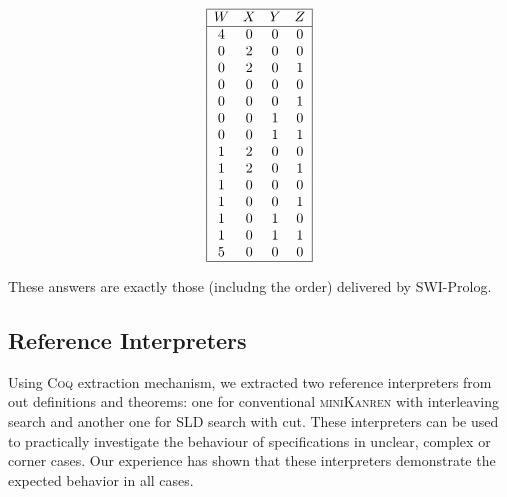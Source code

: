 \[
\begin{array}{|cccc|}
\hline
W & X & Y & Z \\
\hline
4 & 0 & 0 & 0 \\
0 & 2 & 0 & 0 \\
0 & 2 & 0 & 1 \\
0 & 0 & 0 & 0 \\
0 & 0 & 0 & 1 \\
0 & 0 & 1 & 0 \\
0 & 0 & 1 & 1 \\
1 & 2 & 0 & 0 \\
1 & 2 & 0 & 1 \\
1 & 0 & 0 & 0 \\
1 & 0 & 0 & 1 \\
1 & 0 & 1 & 0 \\
1 & 0 & 1 & 1 \\
5 & 0 & 0 & 0 \\
\hline
\end{array}
\]

These answers are exactly those (includng the order) delivered by SWI-Prolog. 

\subsection{Reference Interpreters}

Using \textsc{Coq} extraction mechanism, we extracted two reference interpreters from out definitions and theorems: one for conventional
\textsc{miniKanren} with interleaving search and another one for SLD search with cut. These interpreters can be used to practically investigate the behaviour
of specifications in unclear, complex or corner cases. Our experience has shown that these interpreters demonstrate the expected behavior
in all cases.
